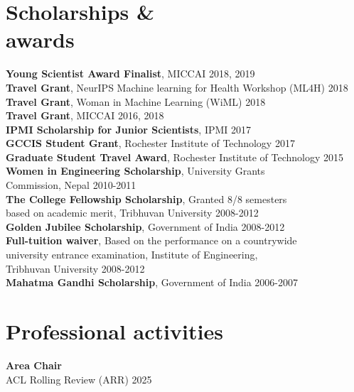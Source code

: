 \documentclass[margin]{res}
\begin{document}
\begin{resume}
\section{Scholarships \&\\awards}

\textbf{Young Scientist Award Finalist}, MICCAI \hfill 2018, 2019\\

\textbf{Travel Grant}, NeurIPS Machine learning for Health Workshop (ML4H) \hfill 2018\\
\textbf{Travel Grant}, Woman in Machine Learning (WiML) \hfill 2018\\ 
\textbf{Travel Grant}, MICCAI \hfill 2016, 2018\\ 
\textbf{IPMI Scholarship for Junior Scientists}, IPMI \hfill 2017\\
\textbf{GCCIS Student Grant}, Rochester Institute of Technology \hfill 2017\\
\textbf{Graduate Student Travel Award}, Rochester Institute of Technology \hfill 2015\\
\textbf{Women in Engineering Scholarship}, University Grants\\ Commission, Nepal \hfill 2010-2011\\
\textbf{The College Fellowship Scholarship}, Granted 8/8 semesters \\based on academic merit, Tribhuvan University \hfill 2008-2012\\
\textbf{Golden Jubilee Scholarship}, Government of India \hfill 2008-2012\\
\textbf{Full-tuition waiver}, Based on the performance on a countrywide\\ university entrance examination, Institute of Engineering,\\ Tribhuvan University \hfill 2008-2012\\
\textbf{Mahatma Gandhi Scholarship}, Government of India \hfill 2006-2007

\section{Professional activities}
\textbf{Area Chair}\\
ACL Rolling Review (ARR) \hfill 2025


\end{resume}
\end{document}
